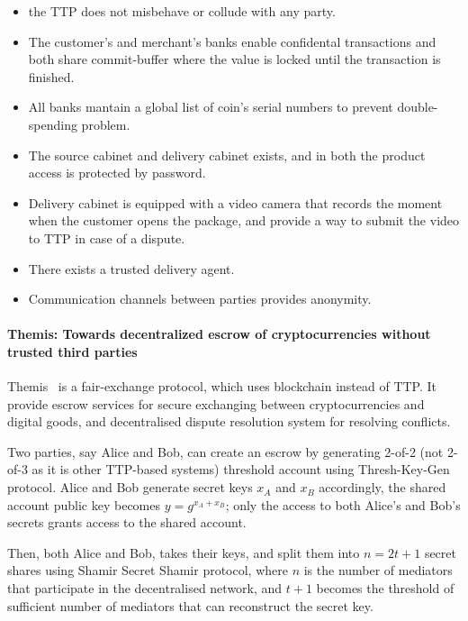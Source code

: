 \documentclass{ieeeaccess}
\begin{document}
\begin{itemize}
    \item the TTP does not misbehave or collude with any party. 
    \item The customer's and merchant's banks enable confidental transactions and both share commit-buffer where the value is locked until the transaction is finished.   
    \item All banks mantain a global list of coin's serial numbers to prevent double-spending problem. 
    \item The source cabinet and delivery cabinet exists, and in both the product access is protected by password.
    \item Delivery cabinet is equipped with a video camera that records the moment when the customer opens the package, and provide a way to submit the video to TTP in case of a dispute. 
    \item There exists a trusted delivery agent.
    \item Communication channels between parties provides anonymity.
\end{itemize}

\paragraph{Themis: Towards decentralized escrow of cryptocurrencies without trusted third parties}\label{themis-towards-decentralized-escrow-of-cryptocurrencies-without-trusted-third-parties}

Themis~\cite{meng2019themis} is a fair-exchange
protocol, which uses blockchain instead of TTP. It provide escrow
services for secure exchanging between cryptocurrencies and digital goods, and decentralised dispute resolution system for resolving conflicts.

Two parties, say Alice and Bob, can create an escrow by generating
2-of-2 (not 2-of-3 as it is other TTP-based systems) threshold account
using Thresh-Key-Gen protocol. Alice and Bob generate secret keys
\(x_A\) and \(x_B\) accordingly, the shared account public key becomes
\(y = g^{x_A+x_B}\); only the access to both Alice's and Bob's secrets
grants access to the shared account.

Then, both Alice and Bob, takes their keys, and split them into
\(n=2t+1\) secret shares using Shamir Secret Shamir protocol, where
\(n\) is the number of mediators that participate in the decentralised
network, and \(t+1\) becomes the threshold of sufficient number of
mediators that can reconstruct the secret key.
\end{document}

